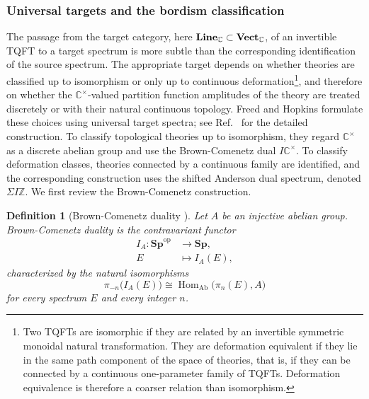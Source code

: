 \documentclass[aps,prx,reprint,superscriptaddress,twocolumn,amsmath,amssymb,amsfonts, nofootinbib]{revtex4-2}
\newcommand{\vect}{{\bf Vect}_{\mathbb{C}}}
\newcommand{\Line}{{\bf Line}_{\mathbb{C}}}
\theoremstyle{apsstyle}
\newtheorem{definition}[theorem]{Definition}
\begin{document}
\subsubsection{Universal targets and the bordism classification}
\label{sec:cob_classification_computation}

The passage from the target category, here $\Line \subset \vect$, of an invertible TQFT to a target spectrum is more subtle than the corresponding identification of the source spectrum. The appropriate target depends on whether theories are classified up to isomorphism or only up to continuous deformation\footnote{Two TQFTs are isomorphic if they are related by an invertible symmetric monoidal natural transformation. They are deformation equivalent if they lie in the same path component of the space of theories, that is, if they can be connected by a continuous one-parameter family of TQFTs. Deformation equivalence is therefore a coarser relation than isomorphism.}, and therefore on whether the $\mathbb{C}^{\times}$-valued partition function amplitudes of the theory are treated discretely or with their natural continuous topology. Freed and Hopkins formulate these choices using universal target spectra; see Ref.~\cite[Sec.~5.3]{FreedHopkins} for the detailed construction. To classify topological theories up to isomorphism, they regard $\mathbb C^\times$ as a discrete abelian group and use the Brown-Comenetz dual $I\mathbb C^\times$. To classify deformation classes, theories connected by a continuous family are identified, and the corresponding construction uses the shifted Anderson dual spectrum, denoted $\Sigma I\mathbb{Z}$. We first review the Brown-Comenetz construction.

\bigskip 

\begin{definition}[Brown-Comenetz duality {\cite{BrownComenetz1976}}]
\label{def:Brown_Comenetz_duality}
Let $A$ be an injective abelian group. Brown-Comenetz duality is the
contravariant functor
\begin{equation}
\begin{aligned}
    I_A:
    \mathbf{Sp}^{\mathrm{op}}
    &\longrightarrow
    \mathbf{Sp},\\
    E
    &\longmapsto
    I_A(E),
\end{aligned}
\label{eq:Brown_Comenetz_functor}
\end{equation}
characterized by the natural isomorphisms
\begin{equation}
    \pi_{-n}\bigl(I_A(E)\bigr)
    \cong
    \operatorname{Hom}_{\mathrm{Ab}}
    \bigl(\pi_n(E),A\bigr)
    \label{eq:Brown_Comenetz_defining_property}
\end{equation}
for every spectrum $E$ and every integer $n$.
\end{definition}
\end{document}
